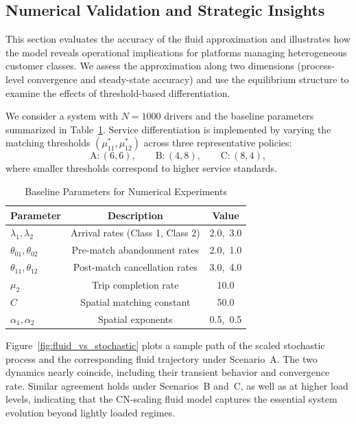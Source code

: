 \subsection{Numerical Validation and Strategic Insights}
\label{sec:numerical_validation_and_insights}

This section evaluates the accuracy of the fluid approximation and illustrates how the model reveals
operational implications for platforms managing heterogeneous customer classes. We assess the
approximation along two dimensions (process-level convergence and steady-state accuracy) and use
the equilibrium structure to examine the effects of threshold-based differentiation.

We consider a system with $N=1000$ drivers and the baseline parameters summarized in
Table~\ref{tab:baseline_parameters}. Service differentiation is implemented by varying the matching
thresholds $(\mu_{11}^*, \mu_{12}^*)$ across three representative policies:
\begin{equation*}
  \text{A}: (6,6),\qquad
  \text{B}: (4,8),\qquad
  \text{C}: (8,4),
\end{equation*}
where smaller thresholds correspond to higher service standards.

\begin{table}[htbp]
\centering
\caption{Baseline Parameters for Numerical Experiments}
\label{tab:baseline_parameters}
\begin{tabular}{lcc}
\toprule
Parameter & Description & Value \\
\midrule
$\lambda_1, \lambda_2$ & Arrival rates (Class 1, Class 2) & 2.0,\ 3.0 \\
$\theta_{01}, \theta_{02}$ & Pre-match abandonment rates & 2.0,\ 1.0 \\
$\theta_{11}, \theta_{12}$ & Post-match cancellation rates & 3.0,\ 4.0 \\
$\mu_2$ & Trip completion rate & 10.0 \\
$C$ & Spatial matching constant & 50.0 \\
$\alpha_1, \alpha_2$ & Spatial exponents & 0.5,\ 0.5 \\
\bottomrule
\end{tabular}
\end{table}

Figure~\ref{fig:fluid_vs_stochastic} plots a sample path of the scaled stochastic process and the corresponding fluid trajectory under Scenario~A.
The two dynamics nearly coincide, including their transient behavior and convergence rate.
Similar agreement holds under Scenarios~B and~C, as well as at higher load levels, indicating that the CN-scaling fluid model captures the essential system evolution beyond lightly loaded regimes.

